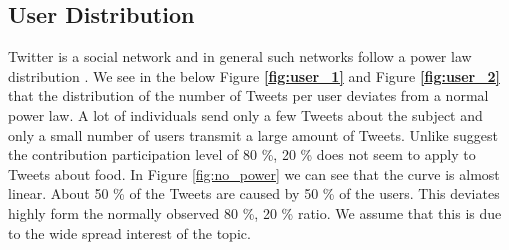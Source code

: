 \subsection {User Distribution}

Twitter is a social network and in general such networks follow a power law distribution \cite{Whittaker:1998}. We see in the below Figure \textbf{\ref{fig:user_1}} and Figure \textbf{\ref{fig:user_2}}  that the distribution of the number of Tweets per user deviates from a normal power law. A lot of individuals  send only a few Tweets about the subject and only a small number of users transmit a large amount of Tweets. Unlike \cite{bild15} suggest the contribution participation level of  80 \%, 20 \%   does not seem to apply to Tweets about food. In Figure \ref{fig:no_power} we can see that the curve is almost linear. About 50 \% of the Tweets are caused by 50 \% of the users. This deviates highly form the normally observed 80 \%, 20 \% ratio. We assume that this is due to the wide spread interest of the topic.




